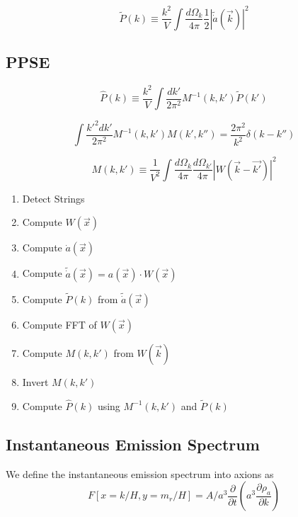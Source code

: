 \documentclass[a4paper]{article}
\begin{document}
\begin{equation}
    \tilde{P}(k) \equiv \frac{k^2}{V} \int \frac{d \Omega_k}{4\pi} \frac{1}{2} \left| \tilde{\dot{a}}( \vec{k} ) \right|^2
\end{equation}

\subsection{PPSE}

\begin{equation}
    \hat{P}(k) \equiv \frac{k^2}{V} \int \frac{d k'}{2 \pi^2} M^{-1}(k, k') \tilde{P}(k')
\end{equation}

\begin{equation}
    \int \frac{k'^2 d k'}{2 \pi^2} M^{-1}(k, k') M(k', k'') = \frac{2\pi^2}{k^2} \delta(k - k'')
\end{equation}

\begin{equation}
    M(k, k') \equiv \frac{1}{V^2} \int \frac{d \Omega_k}{4 \pi} \frac{d \Omega_{k'}}{4 \pi} \left| W(\vec{k} - \vec{k'}) \right|^2
\end{equation}

\begin{enumerate}
    \item Detect Strings
    \item Compute $W(\vec{x})$
    \item Compute $\dot{a}(\vec{x})$
    \item Compute $\tilde{\dot{a}}(\vec{x}) = a(\vec{x}) \cdot W(\vec{x})$
    \item Compute $\tilde{P}(k)$ from $\tilde{\dot{a}}(\vec{x})$
    \item Compute FFT of $W(\vec{x})$
    \item Compute $M(k, k')$ from $W(\vec{k})$
    \item Invert $M(k, k')$
    \item Compute $\hat{P}(k)$ using $M^{-1}(k, k')$ and $\tilde{P}(k)$
\end{enumerate}

\subsection{Instantaneous Emission Spectrum}
We define the instantaneous emission spectrum into axions as
\begin{equation}
    F[x = k / H, y = m_r / H] = A / a^3 \frac{\partial}{\partial t} \left( a^3 \frac{\partial \rho_a}{\partial k} \right)
\end{equation}
\end{document}
